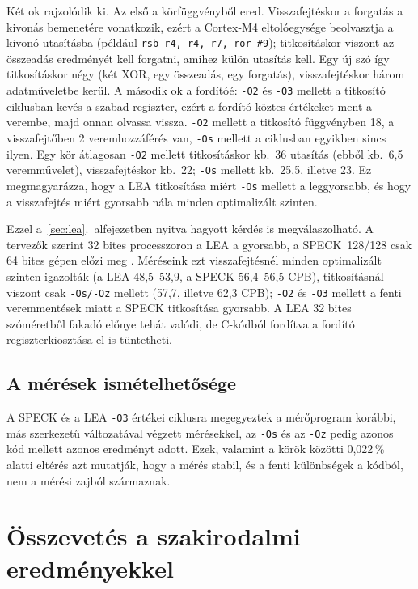 \documentclass[a4paper,12pt]{report}
\theoremstyle{definition}
\theoremstyle{remark}
\begin{document}
Két ok rajzolódik ki. Az első a körfüggvényből ered. Visszafejtéskor a forgatás a kivonás bemenetére vonatkozik, ezért a Cortex-M4 eltolóegysége beolvasztja a kivonó utasításba (például \texttt{rsb r4, r4, r7, ror \#9}); titkosításkor viszont az összeadás eredményét kell forgatni, amihez külön utasítás kell. Egy új szó így titkosításkor négy (két XOR, egy összeadás, egy forgatás), visszafejtéskor három adatműveletbe kerül. A második ok a fordítóé: \texttt{-O2} és \texttt{-O3} mellett a titkosító ciklusban kevés a szabad regiszter, ezért a fordító köztes értékeket ment a verembe, majd onnan olvassa vissza. \texttt{-O2} mellett a titkosító függvényben 18, a visszafejtőben 2 veremhozzáférés van, \texttt{-Os} mellett a ciklusban egyikben sincs ilyen. Egy kör átlagosan \texttt{-O2} mellett titkosításkor kb.\ 36 utasítás (ebből kb.\ 6,5 veremművelet), visszafejtéskor kb.\ 22; \texttt{-Os} mellett kb.\ 25,5, illetve 23. Ez megmagyarázza, hogy a LEA titkosítása miért \texttt{-Os} mellett a leggyorsabb, és hogy a visszafejtés miért gyorsabb nála minden optimalizált szinten.

Ezzel a~\ref{sec:lea}.~alfejezetben nyitva hagyott kérdés is megválaszolható. A tervezők szerint 32 bites processzoron a LEA a gyorsabb, a SPECK~128/128 csak 64 bites gépen előzi meg \cite{Hong2013}. Méréseink ezt visszafejtésnél minden optimalizált szinten igazolták (a LEA 48,5--53,9, a SPECK 56,4--56,5 CPB), titkosításnál viszont csak \texttt{-Os/-Oz} mellett (57,7, illetve 62,3 CPB); \texttt{-O2} és \texttt{-O3} mellett a fenti veremmentések miatt a SPECK titkosítása gyorsabb. A LEA 32 bites szóméretből fakadó előnye tehát valódi, de C-kódból fordítva a fordító regiszterkiosztása el is tüntetheti.

\subsection{A mérések ismételhetősége}

A SPECK és a LEA \texttt{-O3} értékei ciklusra megegyeztek a mérőprogram korábbi, más szerkezetű változatával végzett mérésekkel, az \texttt{-Os} és az \texttt{-Oz} pedig azonos kód mellett azonos eredményt adott. Ezek, valamint a körök közötti 0,022\,\% alatti eltérés azt mutatják, hogy a mérés stabil, és a fenti különbségek a kódból, nem a mérési zajból származnak.

\section{Összevetés a szakirodalmi eredményekkel}\label{sec:irodalmi_osszevetes}
\end{document}
